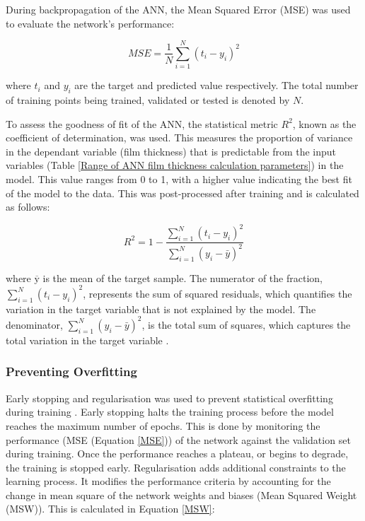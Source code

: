 During backpropagation of the ANN, the Mean Squared Error (MSE) was used to evaluate the network's performance:

\begin{equation}\label{MSE}
	M S E=\frac{1}{N} \sum_{i=1}^N\left(t_i-y_i\right)^2
\end{equation}

where $t_i$ and $y_i$ are the target and predicted value respectively. The total number of training points being trained, validated or tested is denoted by $N$. 

To assess the goodness of fit of the ANN, the statistical metric $R^2$, known as the coefficient of determination, was used. This measures the proportion of variance in the dependant variable (film thickness) that is predictable from the input variables (Table \ref{Range of ANN film thickness calculation parameters}) in the model. This value ranges from 0 to 1, with a higher value indicating the best fit of the model to the data. This was post-processed after training and is calculated as follows:

\begin{equation}\label{R-squared}
	R^2=1-\frac{\sum_{i=1}^N\left(t_i-y_i\right)^2}{\sum_{i=1}^N\left(y_i-\bar{y}\right)^2}
\end{equation}

 where $\overline{\mathrm{y}}$ is the mean of the target sample. The numerator of the fraction, \( \sum_{i=1}^N(t_i - y_i)^2 \), represents the sum of squared residuals, which quantifies the variation in the target variable that is not explained by the model. The denominator, \( \sum_{i=1}^N(y_i - \bar{y})^2 \), is the total sum of squares, which captures the total variation in the target variable \cite{Marian2022}.

\subsubsection{Preventing Overfitting} \label{Preventing overfitting}

Early stopping and regularisation was used to prevent statistical overfitting during training \cite{MatlabOverfit}. Early stopping halts the training process before the model reaches the maximum number of epochs. This is done by monitoring the performance (MSE (Equation \ref{MSE})) of the network against the validation set during training. Once the performance reaches a plateau, or begins to degrade, the training is stopped early. Regularisation adds additional constraints to the learning process. It modifies the performance criteria by accounting for the change in mean square of the network weights and biases (Mean Squared Weight (MSW)). This is calculated in Equation \ref{MSW}: 

